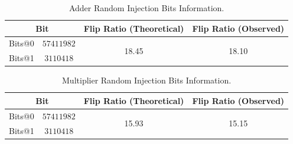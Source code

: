 



\begin{table}[tb!]
\center
\caption{Adder Random Injection Bits Information.}

\label{RI}

\begin{tabular}{c c  c c   } 
 \hline
\multicolumn{2}{c}{Bit}     & Flip Ratio (Theoretical) &  Flip Ratio (Observed)   \\ 
 \hline
 
 Bits@0 & $57 411 982  $ & \multirow{2}{*}{18.45} & \multirow{2}{*}{18.10} \\
 Bits@1 & $3110418$  & &\\ 
 \hline
% 

 
 
\end{tabular}
\end{table}


\begin{table}[tb!]
\center
\caption{Multiplier Random Injection Bits Information.}

\label{RIM}

\begin{tabular}{c c  c c   } 
 \hline
\multicolumn{2}{c}{Bit}     & Flip Ratio (Theoretical) &  Flip Ratio (Observed)   \\ 
 \hline
 
 Bits@0 & $57 411 982  $ & \multirow{2}{*}{15.93} & \multirow{2}{*}{15.15} \\
 Bits@1 & $3110418$  & &\\ 
 \hline
% 

 
 
\end{tabular}
\end{table}





